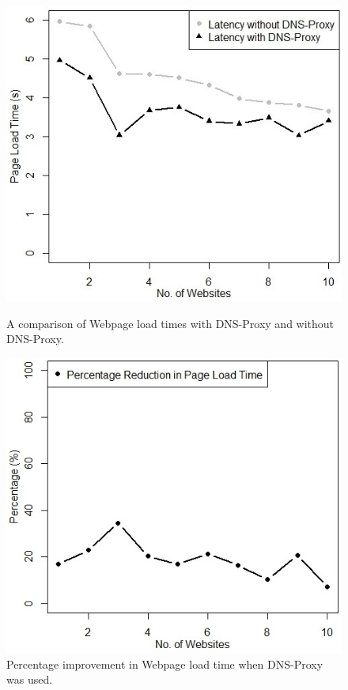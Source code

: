 \documentclass{llncs}
\begin{document}

\begin{figure}
\includegraphics[width=\linewidth]{figures/page_download_time_comparison}
\caption{A comparison of Webpage load times with DNS-Proxy and without DNS-Proxy.}
\endminipage\hfill
{}%
\includegraphics[width=\linewidth]{figures/page_download_percentage}
\caption{Percentage improvement in Webpage load time when DNS-Proxy was used.}
\endminipage
\end{figure}
\end{document}
